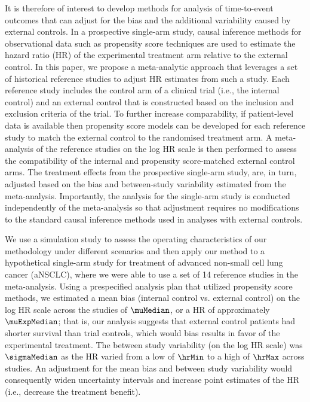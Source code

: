 \documentclass[11pt,final,fleqn]{article}\usepackage[]{graphicx}\usepackage[]{color}
\begin{document}
It is therefore of interest to develop methods for analysis of time-to-event outcomes that can adjust for the bias and the additional variability caused by external controls. 
In a prospective single-arm study, causal inference methods for observational data such as propensity score techniques are used to estimate the hazard ratio (HR) of the experimental treatment arm relative to the external control. In this paper, we propose a meta-analytic approach that leverages a set of historical reference studies to adjust HR estimates from such a study.  Each reference study includes the control arm of a clinical trial (i.e., the internal control) and an external control that is constructed based on the inclusion and exclusion criteria of the trial. To further increase comparability, if patient-level data is available then propensity score models can be developed for each reference study to match the external control to the randomised treatment arm. A meta-analysis of the reference studies on the log HR scale is then performed to assess the compatibility of the internal and propensity score-matched external control arms. The treatment effects from the prospective single-arm study, are, in turn, adjusted based on the bias and between-study variability estimated from the meta-analysis. Importantly, the analysis for the single-arm study is conducted independently of the meta-analysis so that adjustment requires no modifications to the standard causal inference methods used in analyses with external controls. 

We use a simulation study to assess the operating characteristics of our methodology under different scenarios and then apply our method to a hypothetical single-arm study for treatment of advanced non-small cell lung cancer (aNSCLC), where we were able to use a set of 14 reference studies in the meta-analysis. Using a prespecified analysis plan that utilized propensity score methods, we estimated a mean bias (internal control vs. external control) on the log HR scale across the studies of $\muMedian$, or a HR of approximately $\muExpMedian$; that is, our analysis suggests that external control patients had shorter survival than trial controls, which would bias results in favor of the experimental treatment. The between study variability (on the log HR scale) was $\sigmaMedian$ as the HR varied from a low of $\hrMin$ to a high of $\hrMax$ across studies. An adjustment for the mean bias and between study variability would consequently widen uncertainty intervals and increase point estimates of the HR (i.e., decrease the treatment benefit). 
\end{document}

